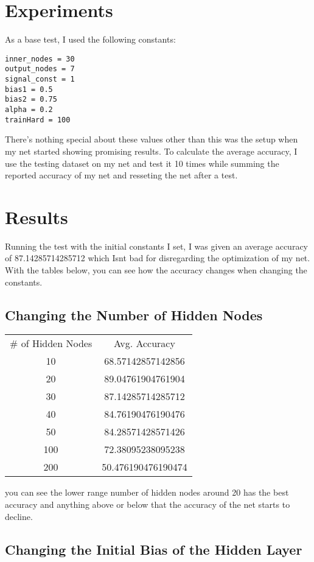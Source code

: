 \documentclass[letterpaper]{article}
\begin{document}
\section{Experiments}
As a base test, I used the following constants:
\begin{lstlisting}
inner_nodes = 30
output_nodes = 7
signal_const = 1
bias1 = 0.5
bias2 = 0.75
alpha = 0.2
trainHard = 100
\end{lstlisting}
There's nothing special about these values other than this was the setup when my net started showing promising results. To calculate the average accuracy, I use the testing dataset on my net and test it 10 times while summing the reported accuracy of my net and resseting the net after a test.  

\section{Results} 
Running the test with the initial constants I set, I was given an average accuracy of 87.14285714285712 which Isnt bad for disregarding the optimization of my net. With the tables below, you can see how the accuracy changes when changing the constants.

\subsection{Changing the Number of Hidden Nodes}


\begin{center}
\begin{tabular}{ c c }
\# of Hidden Nodes & Avg. Accuracy\\
10 & 68.57142857142856 \\
20 & 89.04761904761904 \\
30   &  87.14285714285712 \\
40 & 84.76190476190476 \\
50 & 84.28571428571426 \\
100 & 72.38095238095238 \\
200 & 50.476190476190474 \\
\end{tabular}
\end{center}



you can see the lower range number of hidden nodes around 20 has the best accuracy and anything above or below that the accuracy of the net starts to decline.


\subsection{Changing the Initial Bias of the Hidden Layer}
\end{document}
